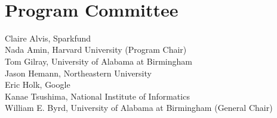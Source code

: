 \documentclass[a4paper]{book}
\begin{document}
\ \\

\section*{Program Committee}
\noindent
Claire Alvis, Sparkfund\\
Nada Amin, Harvard University (Program Chair)\\
Tom Gilray, University of Alabama at Birmingham\\
Jason Hemann, Northeastern University\\
Eric Holk, Google\\
Kanae Tsushima, National Institute of Informatics\\
William E. Byrd, University of Alabama at Birmingham (General Chair)\\

\tableofcontents
\mainmatter
{}



\ \\
\pagebreak



\ \\
\pagebreak



\ \\
\pagebreak



\ \\
\pagebreak



\ \\
\pagebreak



\ \\
\pagebreak
\end{document}
